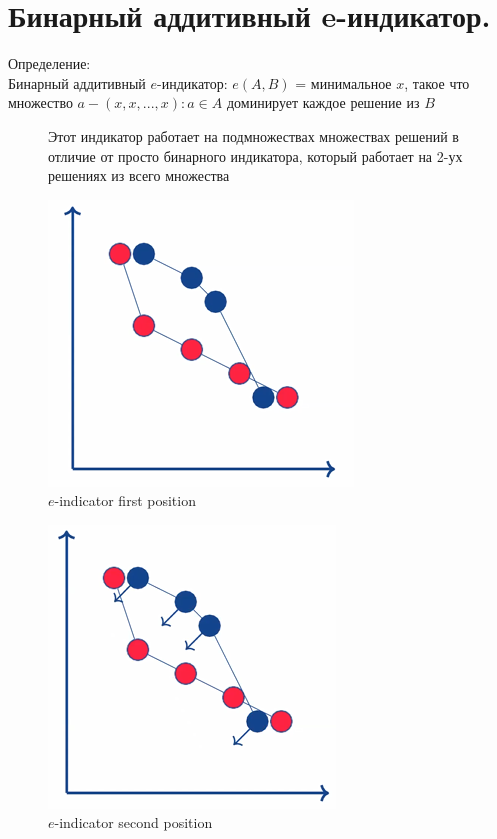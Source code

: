\section{Бинарный аддитивный e-индикатор.}
Определение:\\
Бинарный аддитивный $e$-индикатор: $e(A, B)$ = минимальное $x$, такое что
множество ${a − (x, x,...,x) : a ∈A}$ доминирует каждое решение из $B$\\

\begin{figure}[!ht]
Этот индикатор работает на подмножествах множествах решений в отличие от просто бинарного индикатора, который работает на 2-ух решениях из всего множества
\begin{center}
    \includegraphics[width=0.3\linewidth]{images/e-indicator1.PNG}
    \caption{$e$-indicator first position}
    \label{fig:mpr}
    
\end{center}

\end{figure}

\begin{figure}[!ht]

\begin{center}
    \includegraphics[width=0.3\linewidth]{images/e-indicator3.PNG}
    \caption{$e$-indicator second position}
    \label{fig:mpr}
    
\end{center}

\end{figure}

